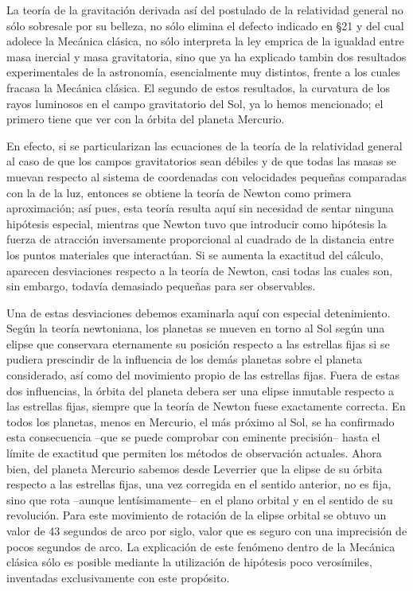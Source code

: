 \documentclass[spanish]{book}
\begin{document}
La teoría de la gravitación derivada así del postulado de la relatividad general no sólo
sobresale por su belleza, no sólo elimina el defecto indicado en \S 21 y del cual adolece
la Mecánica clásica, no sólo interpreta la ley emprica de la igualdad entre masa
inercial y masa gravitatoria, sino que ya ha explicado tambin dos resultados
experimentales de la astronomía, esencialmente muy distintos, frente a los cuales
fracasa la Mecánica clásica. El segundo de estos resultados, la curvatura de los rayos
luminosos en el campo gravitatorio del Sol, ya lo hemos mencionado; el primero tiene
que ver con la órbita del planeta Mercurio.

En efecto, si se particularizan las ecuaciones de la teoría de la relatividad general al
caso de que los campos gravitatorios sean débiles y de que todas las masas se muevan
respecto al sistema de coordenadas con velocidades pequeñas comparadas con la de la
luz, entonces se obtiene la teoría de Newton como primera aproximación; así pues,
esta teoría resulta aquí sin necesidad de sentar ninguna hipótesis especial, mientras que
Newton tuvo que introducir como hipótesis la fuerza de atracción inversamente
proporcional al cuadrado de la distancia entre los puntos materiales que interactúan. Si
se aumenta la exactitud del cálculo, aparecen desviaciones respecto a la teoría de
Newton, casi todas las cuales son, sin embargo, todavía demasiado pequeñas para ser
observables.

Una de estas desviaciones debemos examinarla aquí con especial detenimiento. Según
la teoría newtoniana, los planetas se mueven en torno al Sol según una elipse que
conservara eternamente su posición respecto a las estrellas fijas si se pudiera prescindir
de la influencia de los demás planetas sobre el planeta considerado, así como del
movimiento propio de las estrellas fijas. Fuera de estas dos influencias, la órbita del
planeta debera ser una elipse inmutable respecto a las estrellas fijas, siempre que la
teoría de Newton fuese exactamente correcta. En todos los planetas, menos en Mercurio,
el más próximo al Sol, se ha confirmado esta consecuencia --que se puede
comprobar con eminente precisión-- hasta el límite de exactitud que permiten los
métodos de observación actuales. Ahora bien, del planeta Mercurio sabemos desde
Leverrier que la elipse de su órbita respecto a las estrellas fijas, una vez corregida en
el sentido anterior, no es fija, sino que rota --aunque lentísimamente-- en el plano
orbital y en el sentido de su revolución. Para este movimiento de rotación de la
elipse orbital se obtuvo un valor de 43 segundos de arco por siglo, valor que es
seguro con una imprecisión de pocos segundos de arco. La explicación de este
fenómeno dentro de la Mecánica clásica sólo es posible mediante la utilización de
hipótesis poco verosímiles, inventadas exclusivamente con este propósito.
\end{document}
